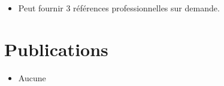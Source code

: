 \documentclass[11pt,a4paper,sans]{moderncv}        %
\begin{document}
\vspace{6pt}
 
\begin{itemize}

\item{Peut fournir 3 références professionnelles sur demande.}

\end{itemize}

\nocite{*}


\section{Publications}
\begin{itemize}
	\item Aucune
\end{itemize}

\end{document}
